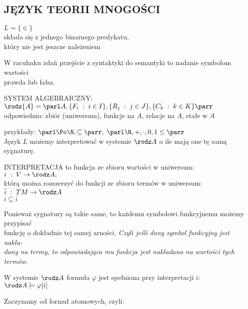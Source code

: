 \documentclass{article}
\begin{document}
\subsection{JĘZYK TEORII MNOGOŚCI}
\begin{center}\large
    {\color{def}$L=\{\in\}$}\smallskip\\
    składa się z jednego binarnego predykatu, \\który nie jest jeszcze należeniem
\end{center}\bigskip
W racuhnku zdań przejście z syntaktyki do semantyki to nadanie symbolom wartości \\prawda lub fałsz.\bigskip
\begin{center}\large
    {\color{def}SYSTEM ALGEBRAICZNY:}\smallskip\\
    {\color{emp}$\rodz{A}=\parl A,\{F_i\;:\;i\in I\},\{R_j\;:\;j\in J\},\{C_k\;:\;k\in K\}\parr$}\smallskip\\
    {\normalsize odpowiednio: zbiór (uniwersum), funkcje na $A$, relacje na $A$, stałe w $A$}
\end{center}\medskip
przykłady: $\parl \Po\N,\subseteq\parr, \;\parl \R, +, \cdot, 0, 1\leq\parr$\bigskip\\
Język $L$ możemy interpretować w systemie $\rodz A$ o ile mają one tę samą sygnaturę.\bigskip
\begin{center}\large
    {\color{def}INTERPRETACJA} to funkcja ze zbioru wartości w uniwersum:\smallskip\\
    $i\;:\;V\to \rodz A,$\smallskip\\
    którą można rozszerzyć do funkcji ze zbioru termów w uniwersum:\smallskip\\
    $\overline i \;:\;TM\to \rodz A$\\
    $i\subseteq \overline i$
\end{center}\bigskip
Ponieważ sygnatury są takie same, to każdemu symbolowi funkcyjnemu możemy przypisać \\funkcję o dokładnie tej samej arności. \emph{Czyli jeśli dany symbol funkcyjny jest nakła-\\dany na termy, to odpowiadająca mu funkcja jest nakładana na wartości tych termów.}\bigskip
\begin{center}\large
    {\color{emp}W systemie $\rodz A$ formuła $\varphi$ jest spełniona przy interpretacji $i$:}\smallskip\\
    $\rodz A \models \varphi[i]$
\end{center}\bigskip
Zaczynamy od formuł atomowych, czyli:\medskip\\
\end{document}
